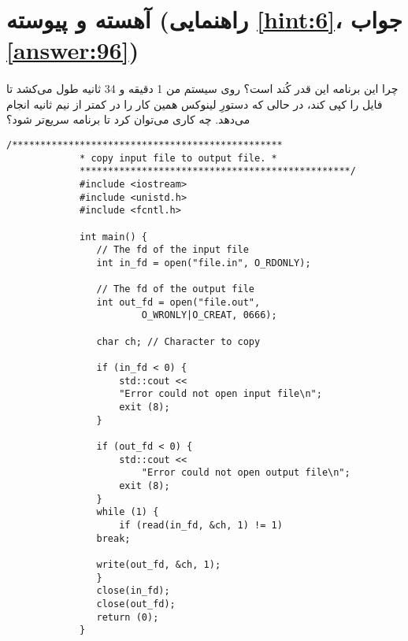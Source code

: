 \section[آهسته و پیوسته]{آهسته و پیوسته \protect{} (راهنمایی \ref{hint:6}، جواب \ref{answer:96})}
\paragraph{}\label{prog:16}
چرا این برنامه این قدر کُند است؟ روی سیستم من 1 دقیقه و 34 ثانیه طول می‌کشد تا فایل را کپی کند، در حالی که دستورِ  لینوکس همین کار را در کمتر از نیم ثانیه انجام می‌دهد. چه کاری می‌توان کرد تا برنامه سریع‌تر شود؟

\begin{LTR}
        \begin{lstlisting}[style=C++Style]
             /************************************************
             * copy input file to output file. *
             ************************************************/
             #include <iostream>
             #include <unistd.h>
             #include <fcntl.h>

             int main() {
             	// The fd of the input file
             	int in_fd = open("file.in", O_RDONLY);

             	// The fd of the output file
             	int out_fd = open("file.out",
             			O_WRONLY|O_CREAT, 0666);

             	char ch; // Character to copy

             	if (in_fd < 0) {
             		std::cout <<
             		"Error could not open input file\n";
             		exit (8);
             	}

             	if (out_fd < 0) {
             		std::cout <<
             			"Error could not open output file\n";
             		exit (8);
             	}
             	while (1) {
             		if (read(in_fd, &ch, 1) != 1)
             	break;

             	write(out_fd, &ch, 1);
             	}
             	close(in_fd);
             	close(out_fd);
             	return (0);
             }
        \end{lstlisting}
\end{LTR}
